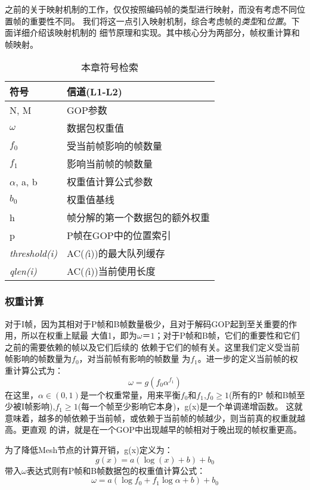之前的关于映射机制的工作，仅仅按照编码帧的类型进行映射，而没有考虑不同位置帧的重要性不同。
我们将这一点引入映射机制，综合考虑帧的\emph{类型}和\emph{位置}。下面详细介绍该映射机制的
细节原理和实现。其中核心分为两部分，帧权重计算和帧映射。

\begin{table}[htbp]
  \centering
  \caption{本章符号检索}
  \label{tab:notations}
  \begin{tabular}{p{3cm}p{8cm}}
  \hline
  符号 & 信道(L1-L2) \\
  \hline
  N, M &  GOP参数 \\
  $\omega$ &  数据包权重值 \\
  $f_{0}$ & 受当前帧影响的帧数量 \\
  $f_{1}$ & 影响当前帧的帧数量 \\
  $\alpha$, a, b & 权重值计算公式参数 \\
  $b_{0}$ & 权重值基线 \\
  h & 帧分解的第一个数据包的额外权重 \\
  p & P帧在GOP中的位置索引 \\
  \emph{threshold(i)} & AC(\emph(i))的最大队列缓存 \\
  \emph{qlen(i)} & AC(\emph(i))当前使用长度 \\
  \hline
  \end{tabular}
\end{table}

\renewcommand{\thesubsubsection}{\Alph{subsubsection}.}
\subsubsection{权重计算}
对于I帧，因为其相对于P帧和B帧数量极少，且对于解码GOP起到至关重要的作用，所以在权重上赋最
大值1，即为$\omega ＝1$；对于P帧和B帧，它们的重要性和它们之前的需要依赖的帧以及它们后续的
依赖于它们的帧有关。这里我们定义受当前帧影响的帧数量为$f_{0}$，对当前帧有影响的帧数量
为$f_{1}$。进一步的定义当前帧的权重计算公式为：
\begin{equation}
\omega = g(f_{0}\alpha^{f_{1}})
\end{equation}
在这里，$\alpha \in (0,1)$是一个权重常量，用来平衡$f_{0}$和$f_{1}$,$f_{0}\geq1$(所有的P
帧和B帧至少被I帧影响),$f_{1}\geq1$(每一个帧至少影响它本身)，g(x)是一个单调递增函数。
这就意味着，越多的帧依赖于当前帧，或依赖于当前帧的帧越少，则当前真的权重就越高。更直观
的讲，就是在一个GOP中出现越早的帧相对于晚出现的帧权重更高。

为了降低Mesh节点的计算开销，g(x)定义为：
\begin{equation}
g(x) = a(\log (x) + b) + b_{0}
\end{equation}
带入$\omega$表达式则有P帧和B帧数据包的权重值计算公式：
\begin{equation}
\label{equ:omega}
\omega = a(\log f_{0} + f_{1}\log \alpha + b) + b_{0}
\end{equation}

